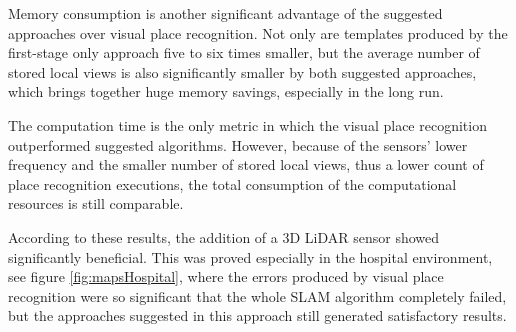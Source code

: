 Memory consumption is another significant advantage of the suggested approaches over visual place recognition. Not only are templates produced by the first-stage only approach five to six times smaller, but the average number of stored local views is also significantly smaller by both suggested approaches, which brings together huge memory savings, especially in the long run.\par
The computation time is the only metric in which the visual place recognition outperformed suggested algorithms. However, because of the sensors' lower frequency and the smaller number of stored local views, thus a lower count of place recognition executions, the total consumption of the computational resources is still comparable.\par
According to these results, the addition of a 3D LiDAR sensor showed significantly beneficial. This was proved especially in the hospital environment, see figure \ref{fig:mapsHospital}, where the errors produced by visual place recognition were so significant that the whole SLAM algorithm completely failed, but the approaches suggested in this approach still generated satisfactory results.
